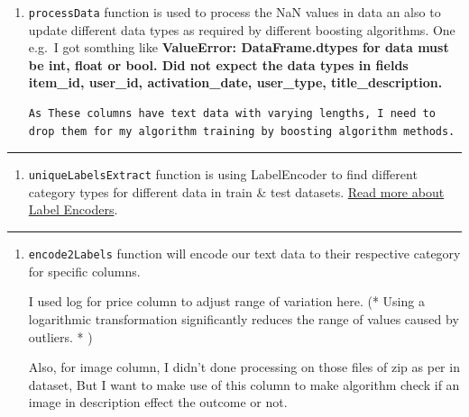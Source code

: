 \documentclass[11pt]{article}
\providecommand{\tightlist}{%
      \setlength{\itemsep}{0pt}\setlength{\parskip}{0pt}}
\begin{document}
\begin{enumerate}
\def\labelenumi{\arabic{enumi}.}
\item
  \texttt{processData} function is used to process the NaN values in
  data an also to update different data types as required by different
  boosting algorithms. One e.g.~I got somthing like \textbf{ValueError:
  DataFrame.dtypes for data must be int, float or bool. Did not expect
  the data types in fields item\_id, user\_id, activation\_date,
  user\_type, title\_description.}

\begin{verbatim}
As These columns have text data with varying lengths, I need to drop them for my algorithm training by boosting algorithm methods.
\end{verbatim}
\end{enumerate}

\begin{center}\rule{0.5\linewidth}{\linethickness}\end{center}

\begin{enumerate}
\def\labelenumi{\arabic{enumi}.}
\setcounter{enumi}{1}
\tightlist
\item
  \texttt{uniqueLabelsExtract} function is using LabelEncoder to find
  different category types for different data in train \& test datasets.
  \href{https://medium.com/@contactsunny/label-encoder-vs-one-hot-encoder-in-machine-learning-3fc273365621}{Read
  more about Label Encoders}.
\end{enumerate}

\begin{center}\rule{0.5\linewidth}{\linethickness}\end{center}

\begin{enumerate}
\def\labelenumi{\arabic{enumi}.}
\setcounter{enumi}{2}
\item
  \texttt{encode2Labels} function will encode our text data to their
  respective category for specific columns.

  I used log for price column to adjust range of variation here. (*
  Using a logarithmic transformation significantly reduces the range of
  values caused by outliers. * )

  Also, for image column, I didn't done processing on those files of zip
  as per in dataset, But I want to make use of this column to make
  algorithm check if an image in description effect the outcome or not.
\end{enumerate}
\end{document}
